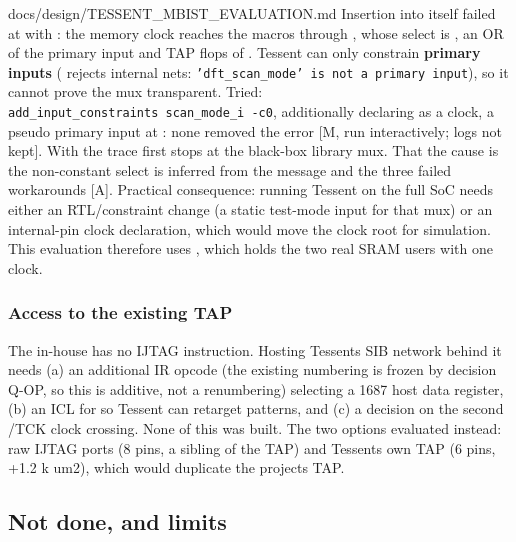 \begin{relocated}{docs/design/TESSENT_MBIST_EVALUATION.md}
Insertion into  itself failed at 
with : the memory clock  reaches the
macros through , whose select is ,
an OR of the primary input  and TAP flops of
. Tessent can only constrain \textbf{primary inputs}
( rejects internal nets:
\texttt{'dft\_\allowbreak{}scan\_\allowbreak{}mode'\ is\ not\ a\ primary\ input}),
so it cannot prove the mux transparent. Tried:
\texttt{add\_\allowbreak{}input\_\allowbreak{}constraints\ scan\_\allowbreak{}mode\_\allowbreak{}i\ -\allowbreak{}c0},
additionally declaring  as a clock, a pseudo primary
input at : none removed the error {[}M, run
interactively; logs not kept{]}. With  the
trace first stops at the black-box library mux. That the cause is the
non-constant select is inferred from the message and the three failed
workarounds {[}A{]}. Practical consequence: running Tessent on the full
SoC needs either an RTL/\allowbreak{}constraint change (a static
test-mode input for that mux) or an internal-pin clock declaration,
which would move the clock root for simulation. This evaluation
therefore uses , which holds the two real SRAM
users with one clock.

\subsubsection{Access to the existing TAP}\label{tm:dec:tessent-mbist-evaluation:72-access-to-the-existing-tap}

The in-house  has no IJTAG instruction. Hosting
Tessent\textquotesingle s SIB network behind it needs (a) an additional
IR opcode (the existing numbering is frozen by decision Q-OP, so this is
additive, not a renumbering) selecting a 1687 host data register, (b) an
ICL for  so Tessent can retarget patterns, and (c) a
decision on the second /TCK clock crossing. None of this
was built. The two options evaluated instead: raw IJTAG ports (8 pins, a
sibling of the TAP) and Tessent\textquotesingle s own TAP (6 pins, +1.2
k um2), which would duplicate the project\textquotesingle s TAP.

\subsection{Not done, and limits}\label{tm:dec:tessent-mbist-evaluation:8-not-done-and-limits}


\end{relocated}
